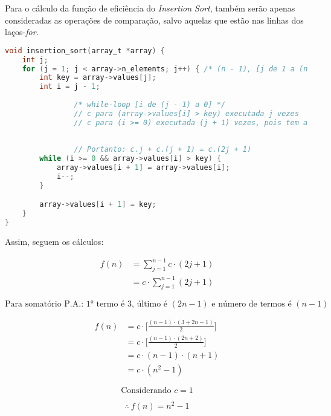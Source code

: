 \documentclass[fontsize=10pt]{article}
\begin{document}
Para o cálculo da função de eficiência do \textit{Insertion Sort}, também serão apenas consideradas as operações de comparação, salvo aquelas que estão nas linhas dos laços-\textit{for}.\\

\begin{lstlisting}[language=C]
void insertion_sort(array_t *array) {
    int j;
    for (j = 1; j < array->n_elements; j++) { /* (n - 1), [j de 1 a (n - 1)]*/
        int key = array->values[j];
        int i = j - 1;
        
				/* while-loop [i de (j - 1) a 0] */
				// c para (array->values[i] > key) executada j vezes
				// c para (i >= 0) executada (j + 1) vezes, pois tem a comparacao do falso
		
		
				// Portanto: c.j + c.(j + 1) = c.(2j + 1)
        while (i >= 0 && array->values[i] > key) { 
            array->values[i + 1] = array->values[i];
            i--;
        }

        array->values[i + 1] = key;
    }
}
\end{lstlisting}

Assim, seguem os cálculos:

\begin{equation} \label{eq4}
\begin{split}
f(n) & = \sum_{j = 1}^{n - 1} c \cdot (2j + 1) \\
	 & = c \cdot \sum_{j = 1}^{n - 1} (2j + 1) 
\end{split}
\end{equation}

$$ \text{Para somatório P.A.: 1° termo é $3$, último é $(2n - 1)$ e número de termos é $(n - 1)$ }$$

\begin{equation} \label{eq5}
\begin{split}
f(n) & = c \cdot \Bigg[ \frac{(n - 1) \cdot (3 + 2n - 1)}{2} \Bigg] \\
	 & = c \cdot \Bigg[ \frac{(n - 1) \cdot (2n + 2)}{2} \Bigg] \\
	 & = c \cdot (n - 1) \cdot (n + 1) \\
	 & = c \cdot (n^2 - 1)
\end{split}
\end{equation}

$$ \text{Considerando $c = 1$}$$

\begin{equation} \label{eq6}
\therefore \ f(n) = n^2 - 1
\end{equation}
\end{document}
